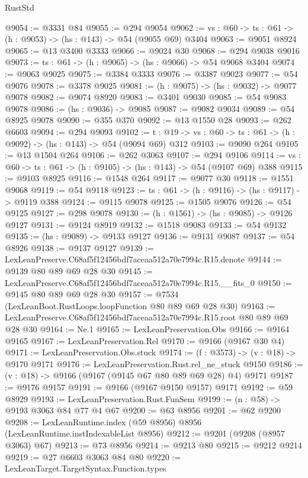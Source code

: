 \begin{lexlean}{RustStd}
\begin{coremodule}
@9054 := @3331 @84
@9055 := @294 @9054
@9062 := {vs : @60} -> {ts : @61} -> (h : @9053) -> (hs : @143) -> @54 (@9055 @69) @3404
@9063 := @9051 @8924
@9065 := @13 @3400 @3333
@9066 := @9024 @30
@9068 := @294 @9038 @9016
@9073 := {ts : @61} -> (h : @9065) -> (hs : @9066) -> @54 @9068 @3404
@9074 := @9063 @9025
@9075 := @3384 @3333
@9076 := @3387 @9023
@9077 := @54 @9076
@9078 := @3378 @9025
@9081 := (h : @9075) -> (hs : @9032) -> @9077 @9078
@9082 := @9074 @8920
@9083 := @3401 @9030
@9085 := @54 @9083 @9078
@9086 := (hs : @9036) -> @9085
@9087 := @9082 @9034
@9089 := @54 @8925 @9078
@9090 := @355 @370
@9092 := @13 @1550 @28
@9093 := @262 @6603
@9094 := @294 @9093
@9102 := {t : @19} -> {vs : @60} -> {ts : @61} -> (h : @9092) -> (hs : @143) -> @54 (@9094 @69) @312
@9103 := @9090 @264
@9105 := @13 @1504 @264
@9106 := @262 @3063
@9107 := @294 @9106
@9114 := {vs : @60} -> {ts : @61} -> (h : @9105) -> (hs : @143) -> @54 (@9107 @69) @388
@9115 := @9103 @8925
@9116 := @1548 @264
@9117 := @9077 @30
@9118 := @1551 @9068
@9119 := @54 @9118
@9123 := {ts : @61} -> (h : @9116) -> (hs : @9117) -> @9119 @388
@9124 := @9115 @9078
@9125 := @1505 @9076
@9126 := @54 @9125
@9127 := @298 @9078
@9130 := (h : @1561) -> (hs : @9085) -> @9126 @9127
@9131 := @9124 @8919
@9132 := @1518 @9083
@9133 := @54 @9132
@9135 := (hs : @9089) -> @9133 @9127
@9136 := @9131 @9087
@9137 := @54 @8926
@9138 := @9137 @9127
@9139 := LexLeanPreserve.C68af5f12456bdf7aceaa512a70e7994c.R15.denote
@9144 := @9139 @80 @89 @69 @28 @30
@9145 := LexLeanPreserve.C68af5f12456bdf7aceaa512a70e7994c.R15.__fits_0
@9150 := @9145 @80 @89 @69 @28 @30
@9157 := @7534 (LexLeanBoot.RustLoops.loopFunction @80 @89 @69 @28 @30)
@9163 := LexLeanPreserve.C68af5f12456bdf7aceaa512a70e7994c.R15.root @80 @89 @69 @28 @30
@9164 := Ne.{1}
@9165 := LexLeanPreservation.Obs
@9166 := @9164 @9165
@9167 := LexLeanPreservation.Rel
@9170 := @9166 (@9167 @30 @4)
@9171 := LexLeanPreservation.Obs.stuck
@9174 := (f : @3573) -> (v : @18) -> @9170 @9171
@9176 := LexLeanPreservation.Rust.rel_ne_stuck @9150
@9186 := (v : @18) -> @9166 (@9167 (@9145 @67 @80 @89 @69 @28) @4) @9171
@9187 := @9176 @9157
@9191 := @9166 (@9167 @9150 @9157) @9171
@9192 := @59 @8929
@9193 := LexLeanPreservation.Rust.FunSem
@9199 := (n : @58) -> @9193 @3063 @84 @77 @4 @67
@9200 := @63 @8956
@9201 := @62 @9200
@9208 := LexLeanRuntime.index (@59 @8956) @8956 (LexLeanRuntime.instIndexableList @8956)
@9212 := @9201 (@9208 (@8957 @3063) @67)
@9213 := @73 @8956
@9214 := @9213 @80
@9215 := @9212 @9214
@9219 := @27 @6603 @3063 @84 @80
@9220 := LexLeanTarget.TargetSyntax.Function.types

\end{coremodule}
\end{lexlean}
